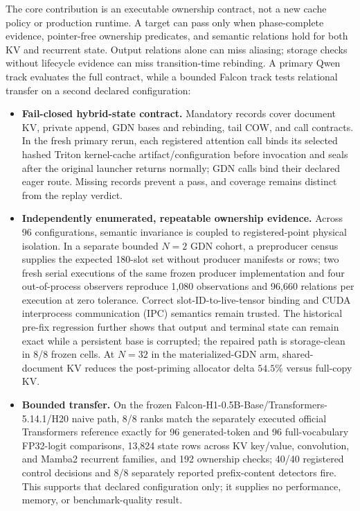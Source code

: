 \documentclass{article}
\begin{document}
The core contribution is an executable ownership contract, not a new cache
policy or production runtime.  A target can pass only when phase-complete
evidence, pointer-free ownership predicates, and semantic relations hold for
both KV and recurrent state.  Output relations alone can miss aliasing; storage
checks without lifecycle evidence can miss transition-time rebinding.  A
primary Qwen track evaluates the full contract, while a bounded Falcon track
tests relational transfer on a second declared configuration:
\begin{itemize}
  \setlength{\itemsep}{1pt}
  \setlength{\parskip}{0pt}
  \item \textbf{Fail-closed hybrid-state contract.} Mandatory records cover
  document KV, private append, GDN bases and rebinding, tail COW, and call
  contracts.  In the fresh primary rerun, each registered attention call binds
  its selected hashed Triton kernel-cache artifact/configuration before
  invocation and seals after the original launcher returns normally; GDN calls
  bind their declared eager route.  Missing records
  prevent a pass, and coverage remains distinct from the replay verdict.
  \item \textbf{Independently enumerated, repeatable ownership evidence.}
  Across 96 configurations, semantic invariance is coupled to registered-point
  physical isolation.  In a separate bounded $N=2$ GDN cohort, a preproducer
  census supplies the expected 180-slot set without producer manifests or rows;
  two fresh serial executions of the same frozen producer implementation and
  four out-of-process observers reproduce 1,080 observations and 96,660
  relations per execution at zero tolerance.  Correct slot-ID-to-live-tensor
  binding and CUDA interprocess communication (IPC) semantics remain trusted.
  The historical pre-fix regression further shows that output and terminal
  state can remain exact while a persistent base is corrupted; the repaired
  path is storage-clean in 8/8 frozen cells.  At $N=32$ in the
  materialized-GDN arm, shared-document KV reduces the post-priming allocator
  delta $54.5\%$ versus full-copy KV.
  \item \textbf{Bounded transfer.} On the frozen
  Falcon-H1-0.5B-Base/Transformers-5.14.1/H20 naive path, 8/8 ranks match the
  separately executed official Transformers reference
  exactly for 96 generated-token and 96 full-vocabulary FP32-logit comparisons,
  13,824 state rows across KV key/value, convolution, and Mamba2 recurrent
  families, and 192
  ownership checks; 40/40 registered control decisions and 8/8 separately
  reported prefix-content detectors fire.  This supports that declared
  configuration only; it supplies no performance, memory, or benchmark-quality
  result.
\end{itemize}
\end{document}
